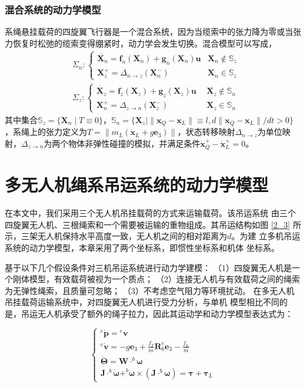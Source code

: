 \documentclass[lang=chs, degree=master, blindreview=false, winfonts=true]{yanputhesis}
\begin{document}
\subsubsection{混合系统的动力学模型}
系绳悬挂载荷的四旋翼飞行器是一个混合系统，因为当缆索中的张力降为零或当张力恢复时松弛的缆索变得绷紧时，动力学会发生切换。混合模型可以写成，
\begin{equation}
	\left.\begin{aligned}&\Sigma_{n}:\left\{\begin{array}{ll}\dot{\bm X_n}=\bm f_n(\bm X_n)+\bm g_n(\bm X_n)\bm u  &\bm X_n\notin \mathbb{S}_z\\\bm X_z^+=\Delta_{n\to z}(\bm X_n^-)  &\bm X_n\in \mathbb{S}_z\end{array}\right.\\&\Sigma_{z}:\left\{\begin{array}{ll}\dot{\bm X_z}=\bm f_z(\bm X_z)+\bm g_z(\bm X_z)\bm u \ \ &\bm X_z\notin \mathbb{S}_n\\\bm X_n^+=\Delta_{z\to n}(\bm X_z^-) \ &\bm X_z\in \mathbb{S}_n\end{array}\right.\end{aligned}\right.
\end{equation}
其中集合$\mathbb S_z = \{ \bm X_n \mid  T \equiv 0 \}$，$\mathbb S_n = \{ \bm X_z \mid \|\bm x_Q - \bm x_L\| \equiv l, d \|\bm x_Q - \bm x_L\| /dt> 0 \}$，系绳上的张力定义为$T = \|m_L (\ddot{\bm x}_L + g\bm{e}_3)\|$，状态转移映射$\Delta_{n\to z}$为单位映射，$\Delta_{z\to n}$为两个物体非弹性碰撞的模拟，并满足条件$\dot{\bm x}_Q^+-\dot{\bm x}_L^+=0$。

\section{多无人机绳系吊运系统的动力学模型}
在本文中，我们采用三个无人机吊挂载荷的方式来运输载荷。该吊运系统
由三个四旋翼无人机、三根绳索和一个需要被运输的重物组成。其吊运结构如图 \ref{2_3} 所示，三架无人机保持水平高度一致，无人机之间的相对距离为$d$。为建
立多机吊运系统的动力学模型，本章采用了两个坐标系，即惯性坐标系和机体
坐标系。


基于以下几个假设条件对三机吊运系统进行动力学建模：
（1）四旋翼无人机是一个刚体模型，有效载荷被视为一个质点；
（2）连接无人机与有效载荷之间的绳索为无弹性绳索，且质量可忽略；
（3）不考虑空气阻力等环境扰动。
在多无人机吊挂载荷运输系统中，对四旋翼无人机进行受力分析，与单机
模型相比不同的是，吊运无人机承受了额外的绳子拉力，因此其运动学和动力学模型表达式为：

\begin{equation}
	\begin{cases}{}^{e}\dot{\boldsymbol{p}}={}^{e}\boldsymbol{v}\\{}^{e}\dot{\boldsymbol{v}}=-g\boldsymbol{e}_{3}+\frac{f_{T}}{m}\boldsymbol{R}_{b}^{e}\boldsymbol{e}_{3}-\frac{f_{L}}{m}\\\dot{\boldsymbol{\Theta}}=\boldsymbol{W}\cdot^{b}\boldsymbol{\omega}\\\boldsymbol{J}\cdot^{b}\dot{\boldsymbol{\omega}}+^{b}\boldsymbol{\omega}\times(\boldsymbol{J}\cdot^{b}\boldsymbol{\omega})=\boldsymbol{\tau}+\boldsymbol{\tau}_{L}\end{cases}
\end{equation}
\end{document}
